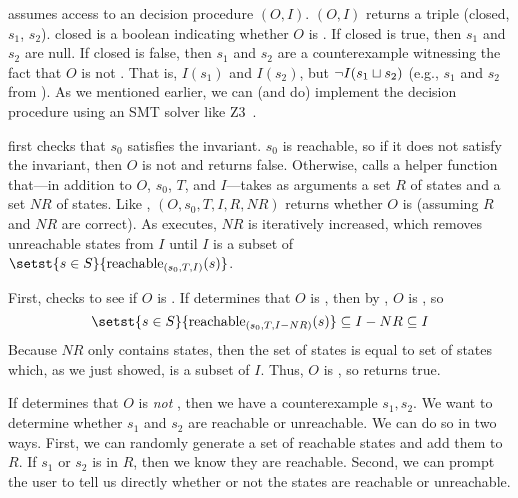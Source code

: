{}

\IsInvConfluent{} assumes access to an \invariantclosure{} decision procedure
\IsIclosed$(O, I)$. \IsIclosed$(O, I)$ returns a triple (closed, $s_1$, $s_2$).
closed is a boolean indicating whether $O$ is \Iclosed{}. If closed is true,
then $s_1$ and $s_2$ are null. If closed is false, then $s_1$ and $s_2$ are a
counterexample witnessing the fact that $O$ is not \Iclosed{}. That is,
$I(s_1)$ and $I(s_2)$, but $\lnot I(s_1 \sqcup s_2)$ (e.g., $s_1$ and $s_2$ from
).  As we mentioned earlier, we can (and do) implement the
\invariantclosure{} decision procedure using an SMT solver like
Z3~\cite{de2008z3}.

\IsInvConfluent{} first checks that $s_0$ satisfies the invariant. $s_0$ is
reachable, so if it does not satisfy the invariant, then $O$ is not
\sTIconfluent{} and \IsInvConfluent{} returns false. Otherwise,
\IsInvConfluent{} calls a helper function \Helper{} that---in addition to $O$,
$s_0$, $T$, and $I$---takes as arguments a set $R$ of \sTIreachable{} states
and a set $NR$ of \sTIunreachable{} states. Like \IsInvConfluent, \Helper$(O,
s_0, T, I, R, NR)$ returns whether $O$ is \sTIconfluent{} (assuming $R$ and
$NR$ are correct).  As  executes, $NR$ is
iteratively increased, which removes unreachable states from $I$ until $I$ is a
subset of $\setst{s \in S}{\sTIreachablepredicate{s}}$.

First, \Helper{} checks to see if $O$ is .
%
If \IsIclosed{} determines that $O$ is , then by
, $O$ is , so
\[
  \setst{s \in S}{\stireachablepredicate{s_0}{T}{I-NR}{s}}
    \subseteq I - NR
    \subseteq I
\]
Because $NR$ only contains \sTIunreachable{} states, then the set of
\sTIreachable{} states is equal to set of  states
which, as we just showed, is a subset of $I$.  Thus, $O$ is \sTIconfluent{}, so
\Helper{} returns true.

If \IsIclosed{} determines that $O$ is \emph{not} , then we
have a counterexample $s_1, s_2$. We want to determine whether $s_1$ and $s_2$
are reachable or unreachable. We can do so in two ways.
%
First, we can randomly generate a set of reachable states and add them to $R$.
If $s_1$ or $s_2$ is in $R$, then we know they are reachable.
%
Second, we can prompt the user to tell us directly whether or not the states
are reachable or unreachable.

